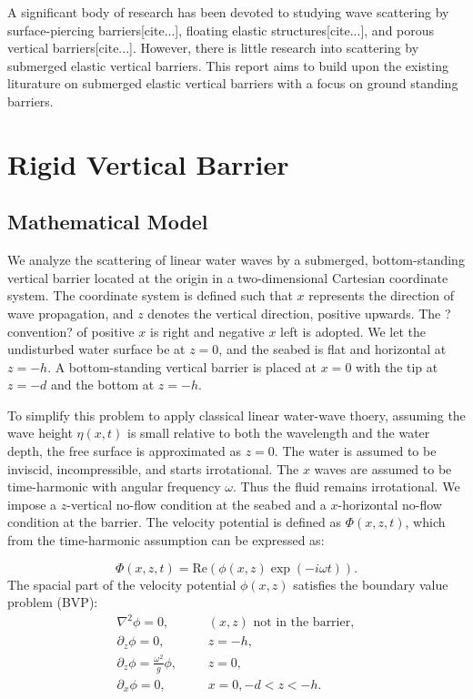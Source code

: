 \documentclass[a4paper,12pt]{report}
\begin{document}
A significant body of research has been devoted to studying wave scattering by surface-piercing barriers[cite...], floating elastic structures[cite...], and porous vertical barriers[cite...]. However, there is little research into scattering by submerged elastic vertical barriers. This report aims to build upon the existing liturature on submerged elastic vertical barriers with a focus on ground standing barriers.

\chapter{Rigid Vertical Barrier}
\section{Mathematical Model}
\label{sec:mathModel}
We analyze the scattering of linear water waves by a submerged, bottom-standing vertical barrier located at the origin in a two-dimensional Cartesian coordinate system. The coordinate system is defined such that $x$ represents the direction of wave propagation, and $z$ denotes the vertical direction, positive upwards. The ?convention? of positive $x$ is right and negative $x$ left is adopted. We let the undisturbed water surface be at $z=0$, and the seabed is flat and horizontal at $z=-h$. A bottom-standing vertical barrier is placed at $x=0$ with the tip at $z=-d$ and the bottom at $z=-h$. 

To simplify this problem to apply classical linear water-wave thoery, assuming the wave height $\eta(x,t)$ is small relative to both the wavelength and the water depth, the free surface is approximated as $z=0$. The water is assumed to be inviscid, incompressible, and starts irrotational. The $x$ waves are assumed to be time-harmonic with angular frequency $\omega$. Thus the fluid remains irrotational. We impose a $z$-vertical no-flow condition at the seabed and a $x$-horizontal no-flow condition at the barrier. The velocity potential is defined as $\Phi(x,z,t)$, which from the time-harmonic assumption can be expressed as:

\begin{equation}
\label{eq:time-harmonic}
\Phi(x,z,t) = \text{Re}(\phi(x,z)\exp(-i\omega t)).
\end{equation}
The spacial part of the velocity potential $\phi(x,z)$ satisfies the boundary value problem (BVP):
\begin{align}
\label{eq:irrotational}
\nabla^2 \phi = 0,&  &&(x,z) \text{ not in the barrier}, \\
\label{eq:noFlowGround}
\partial_z \phi = 0,&  &&z = -h, \\
\label{eq:freeSurface}
\partial_z \phi = \frac{\omega^2}{g}\phi,&  &&z = 0, \\
\label{eq:noFlowBarrier}
\partial_x \phi= 0,&  &&x = 0, -d < z < -h.
\end{align}
\end{document}
